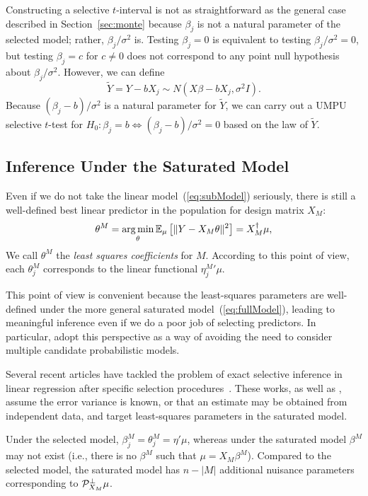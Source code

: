 \documentclass{article}
\theoremstyle{definition}
\newcommand{\bX}{X}
\newcommand{\proj}{\cP}
\begin{document}
Constructing a selective $t$-interval is not as straightforward as the general case described in Section~\ref{sec:monte} because $\beta_j$ is not a natural parameter of the selected model; rather, $\beta_j/\sigma^2$ is. Testing $\beta_j=0$ is equivalent to testing $\beta_j/\sigma^2=0$, but testing $\beta_j=c$ for $c\neq 0$ does not correspond to any point null hypothesis about $\beta_j/\sigma^2$. However, we can define
\begin{equation}
  \widetilde Y = Y-b X_j\sim N(\bX \beta - bX_j, \sigma^2I).
\end{equation}
Because $(\beta_j-b)/\sigma^2$ is a natural parameter for $\widetilde Y$, we can carry out a UMPU selective $t$-test for $H_0:\beta_j=b \iff (\beta_j-b)/\sigma^2=0$ based on the law of $\widetilde Y$.


\subsection{Inference Under the Saturated Model}\label{sec:fullModel}

Even if we do not take the linear model~(\ref{eq:subModel}) seriously, there is still a well-defined best linear predictor in the population for design matrix $\bX_M$:
\begin{equation}
  \theta^{M}=
  \argmin_\theta \E_\mu\left[ \|Y - \bX_M\theta\|^2\right]
  = \bX_M^\dagger \mu,
\end{equation}
We call $\theta^{M}$ the {\em least squares coefficients} for $M$. According to this point of view, each $\theta_j^{M}$ corresponds to the linear functional ${\eta_j^M}'\mu$.

This point of view is convenient because the least-squares parameters are well-defined under the more general saturated model~(\ref{eq:fullModel}), leading to meaningful inference even if we do a poor job of selecting predictors. In particular, \citet{berk2013valid} adopt this perspective as a way of avoiding the need to consider multiple candidate probabilistic models.

Several recent articles have tackled the problem of exact selective inference in linear regression after specific selection procedures~\citep{lee2013exact,loftus2014significance,lee2014marginal}. These works, as well as \citet{berk2013valid}, assume the error variance is known, or that an estimate may be obtained from independent data, and target least-squares parameters in the saturated model.

Under the selected model, $\beta_j^{M} = \theta_j^{M} = \eta'\mu$, whereas under the saturated model $\beta^{M}$ may not exist (i.e., there is no $\beta^M$ such that $\mu = \bX_M\beta^M$). Compared to the selected model, the saturated model has $n-|M|$ additional nuisance parameters corresponding to $\proj_{\bX_M}^\perp \mu$.
\end{document}
